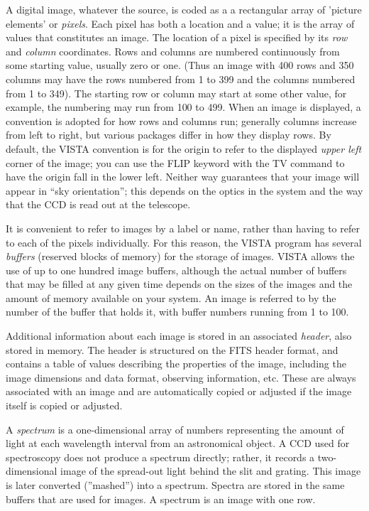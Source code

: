 A digital image, whatever the source, is coded as a a rectangular array of
'picture elements' or \textit{pixels}.  Each pixel has both a location and
a value; it is the array of values that constitutes an image.  The location
of a pixel is specified by its \textit{row} and \textit{column}
coordinates.  Rows and columns are numbered continuously from some starting
value, usually zero or one. (Thus an image with 400 rows and 350 columns
may have the rows numbered from 1 to 399 and the columns numbered from 1 to
349).  The starting row or column may start at some other value, for
example, the numbering may run from 100 to 499.  When an image is
displayed, a convention is adopted for how rows and columns run; generally
columns increase from left to right, but various packages differ in how
they display rows.  By default, the VISTA convention is for the origin to
refer to the displayed \textit{upper left} corner of the image; you can use
the FLIP keyword with the TV command to have the origin fall in the lower
left. Neither way guarantees that your image will appear in ``sky
orientation''; this depends on the optics in the system and the way that
the CCD is read out at the telescope.

It is convenient to refer to images by a label or name, rather than having
to refer to each of the pixels individually.  For this reason, the VISTA
program has several \textit{buffers} (reserved blocks of memory) for the
storage of images.  VISTA allows the use of up to one hundred image
buffers, although the actual number of buffers that may be filled at any
given time depends on the sizes of the images and the amount of memory
available on your system.  An image is referred to by the number of the
buffer that holds it, with buffer numbers running from 1 to 100.

Additional information about each image is stored in an associated
\textit{header}, also stored in memory.  The header is structured on
the FITS header format, and contains a table of values describing the
properties of the image, including the image dimensions and data format,
observing information, etc.  These are always associated with an image and
are automatically copied or adjusted if the image itself is copied or
adjusted.  

A \textit{spectrum} is a one-dimensional array of numbers representing the
amount of light at each wavelength interval from an astronomical object.  A
CCD used for spectroscopy does not produce a spectrum directly; rather, it
records a two-dimensional image of the spread-out light behind the slit and
grating.  This image is later converted (''mashed'') into a spectrum.
Spectra are stored in the same buffers that are used for images.  A
spectrum is an image with one row.

